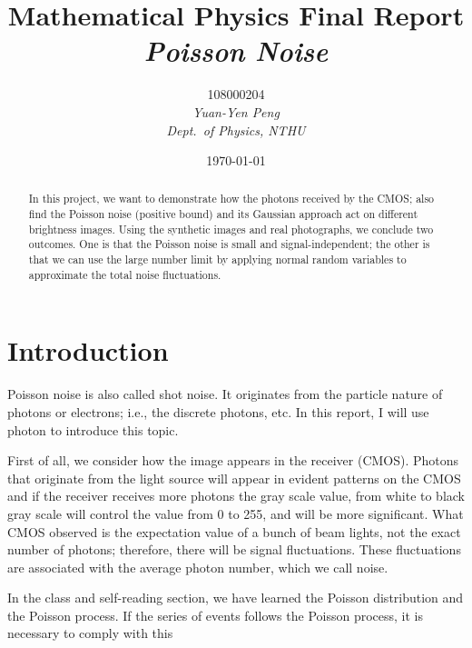 \documentclass[12 pt]{article}
\begin{document}
\title{\textbf{{\normalsize Mathematical Physics Final Report}
                \\\emph{Poisson Noise}}}
\author{108000204
        \\\emph{Yuan-Yen Peng}
        \\\emph{Dept.\ of Physics, NTHU}}
\date{\today}
\maketitle

\begin{abstract} 

  In this project, we want to demonstrate how the photons received by the CMOS\@; also find the Poisson noise (positive bound) and its Gaussian approach act on different brightness images. Using the synthetic images and real photographs, we conclude two outcomes. One is that the Poisson noise is small and signal-independent; the other is that we can use the large number limit by applying normal random variables to approximate the total noise fluctuations.
    
\end{abstract}

\section{Introduction}
	 
  Poisson noise is also called shot noise. It originates from the particle nature of photons or electrons; i.e., the discrete photons, etc. In this report, I will use photon to introduce this topic.
  
  First of all, we consider how the image appears in the receiver (CMOS). Photons that originate from the light source will appear in evident patterns on the CMOS and if the receiver receives more photons the gray scale value, from white to black gray scale will control the value from 0 to 255,  and will be more significant. What CMOS observed is the expectation value of a bunch of beam lights, not the exact number of photons; therefore, there will be signal fluctuations. These fluctuations are associated with the average photon number, which we call noise.
  
  In the class and self-reading section, we have learned the Poisson distribution and the Poisson process. If the series of events follows the Poisson process, it is necessary to comply with this 
  
\end{document}
